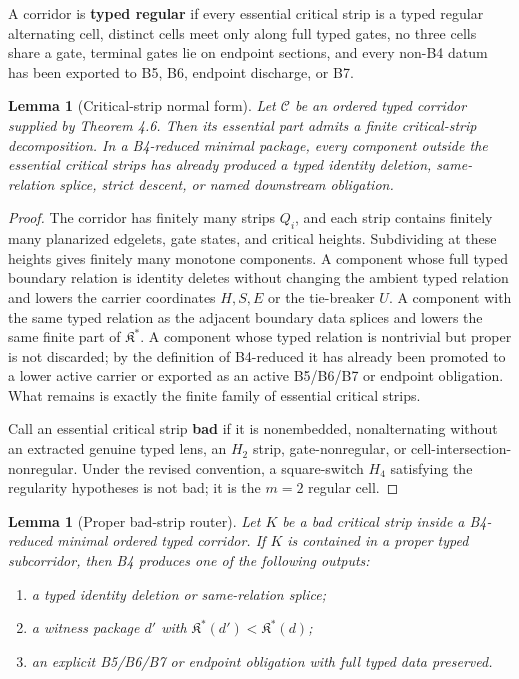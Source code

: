 \documentclass[11pt]{amsart}
\newtheorem{lemma}[theorem]{Lemma}
\theoremstyle{definition}
\begin{document}
A corridor is \textbf{typed regular} if every essential critical strip is a typed regular alternating cell, distinct cells meet only along full typed gates, no three cells share a gate, terminal gates lie on endpoint sections, and every non-B4 datum has been exported to B5, B6, endpoint discharge, or B7.

\begin{lemma}[Critical-strip normal form]
Let \(\mathcal C\) be an ordered typed corridor supplied by Theorem 4.6. Then its essential part admits a finite critical-strip decomposition. In a B4-reduced minimal package, every component outside the essential critical strips has already produced a typed identity deletion, same-relation splice, strict descent, or named downstream obligation.

\end{lemma}
\begin{proof}
The corridor has finitely many strips \(Q_i\), and each strip contains finitely many planarized edgelets, gate states, and critical heights. Subdividing at these heights gives finitely many monotone components. A component whose full typed boundary relation is identity deletes without changing the ambient typed relation and lowers the carrier coordinates \(H,S,E\) or the tie-breaker \(U\). A component with the same typed relation as the adjacent boundary data splices and lowers the same finite part of \(\mathfrak K^\ast\). A component whose typed relation is nontrivial but proper is not discarded; by the definition of B4-reduced it has already been promoted to a lower active carrier or exported as an active B5/B6/B7 or endpoint obligation. What remains is exactly the finite family of essential critical strips.

Call an essential critical strip \textbf{bad} if it is nonembedded, nonalternating without an extracted genuine typed lens, an \(H_2\) strip, gate-nonregular, or cell-intersection-nonregular. Under the revised convention, a square-switch \(H_4\) satisfying the regularity hypotheses is not bad; it is the \(m=2\) regular cell.

\end{proof}
\begin{lemma}[Proper bad-strip router]
Let \(K\) be a bad critical strip inside a B4-reduced minimal ordered typed corridor. If \(K\) is contained in a proper typed subcorridor, then B4 produces one of the following outputs:

\begin{enumerate}
\item a typed identity deletion or same-relation splice;
\item a witness package \(d'\) with \(\mathfrak K^\ast(d')<\mathfrak K^\ast(d)\);
\item an explicit B5/B6/B7 or endpoint obligation with full typed data preserved.
\end{enumerate}

\end{lemma}
\end{document}
